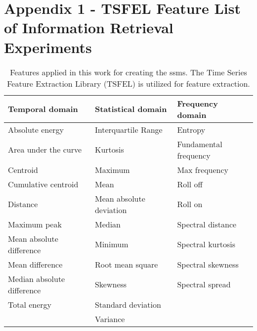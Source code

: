 
%

\chapter{Appendix 1 - TSFEL Feature List of Information Retrieval Experiments}
\label{app:tsfel}

\begin{table}[H]
    \centering
    \caption{Features applied in this work for creating the \gls{ssm}s. The Time Series Feature Extraction Library (TSFEL) is utilized for feature extraction.}
    \begin{tabular}{l|l|l}
    \toprule
        \textbf{Temporal domain} &  \textbf{Statistical domain} & \textbf{Frequency domain}\\
    \midrule
        Absolute energy & Interquartile Range & Entropy\\
        Area under the curve & Kurtosis & Fundamental frequency\\
        Centroid & Maximum & Max frequency\\
        Cumulative centroid & Mean & Roll off\\
        Distance & Mean absolute deviation & Roll on \\
        Maximum peak & Median & Spectral distance\\
        Mean absolute difference & Minimum & Spectral kurtosis\\
        Mean difference & Root mean square & Spectral skewness\\
        Median absolute difference & Skewness & Spectral spread\\
        Total energy & Standard deviation & \\
         & Variance & \\
    \bottomrule
    \end{tabular}
    \label{tab:tsfel_featurelist}
\end{table}